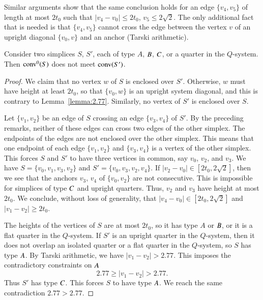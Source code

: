 Similar arguments show that the same conclusion holds for an edge
$\{v_4,v_5\}$ of length at most $2t_0$ such that $|v_4-v_0|\le2t_0$,
$v_5\le2\sqrt{2}$.  The only additional fact that is needed is
that $\{v_4,v_5\}$ cannot cross the edge between the vertex $v$ of
an upright diagonal $\{v_0,v\}$ and an anchor
(Tarski arithmetic).





\begin{lemma}
    Consider two simplices $S$, $S'$, each of  type $A$, $B$, $C$,
or a quarter in the $Q$-system.
    Then 
    ${\operatorname{conv}}^0(S)$ does not meet ${\operatorname{conv}}(S')$.
\end{lemma}

\begin{proof}
We claim that no vertex $w$ of $S$ is enclosed over $S'$.
Otherwise, $w$ must have height at least $2t_0$, so that $\{v_0,w\}$
is an upright system diagonal, and this is
contrary to Lemma~\ref{lemma:2.77}. Similarly, no vertex of $S'$
is enclosed over $S$.

Let $\{v_1,v_2\}$ be an edge of $S$ crossing an edge $\{v_3,v_4\}$ of
$S'$. By the preceding remarks, neither of these edges can cross
two edges of the other simplex. The endpoints of the edges are not
enclosed over the other simplex. This means that one endpoint of
each edge $\{v_1,v_2\}$ and $\{v_3,v_4\}$ is a vertex of the other
simplex.  This forces $S$ and $S'$ to have three vertices in
common, say $v_0$, $v_2$, and $v_3$.  We have $S=\{v_0,v_1,v_3,v_2\}$
and $S'=\{v_0,v_3,v_2,v_4\}$. If
    $|v_2-v_0|\in[2t_0,2\sqrt{2}]$,
then we see that the anchors $v_3$, $v_4$ of $\{v_0,v_2\}$ are not
consecutive.  This is impossible for simplices of type $C$ and
upright quarters.  Thus, $v_2$ and $v_3$ have height at most
$2t_0$.  We conclude, without loss of generality, that
    $|v_4-v_0|\in[2t_0,2\sqrt{2}]$
and $|v_1-v_2|\ge 2t_0$.

The heights of the vertices of $S$ are at most $2t_0$, so it has
type $A$ or $B$, or it is a flat quarter in the $Q$-system. If
$S'$ is an upright quarter in the $Q$-system, then it does not
overlap an isolated quarter or a flat quarter in the $Q$-system,
so $S$ has type $A$. By Tarski arithmetic, we have
$|v_1-v_2|>2.77$.  This imposes the contradictory constraints
on $A$
    $$
    2.77\ge |v_1-v_2|>2.77.
    $$
Thus $S'$ has type $C$.  This forces $S$ to have type $A$.  We
reach the same contradiction  $2.77 > 2.77$.
\end{proof}

